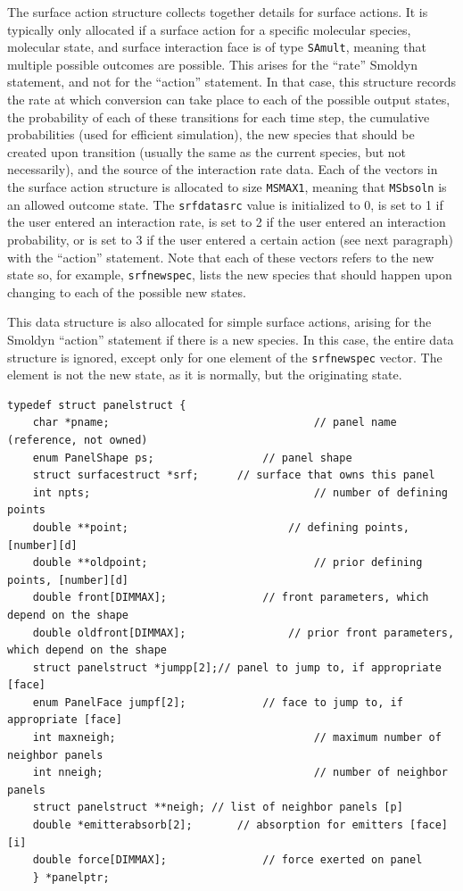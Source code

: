 \documentclass {scrbook}
\newcommand {\ttt} {\texttt}
\begin{document}
The surface action structure collects together details for surface actions. It is typically only allocated if a surface action for a specific molecular species, molecular state, and surface interaction face is of type \ttt{SAmult}, meaning that multiple possible outcomes are possible. This arises for the ``rate'' Smoldyn statement, and not for the ``action'' statement. In that case, this structure records the rate at which conversion can take place to each of the possible output states, the probability of each of these transitions for each time step, the cumulative probabilities (used for efficient simulation), the new species that should be created upon transition (usually the same as the current species, but not necessarily), and the source of the interaction rate data. Each of the vectors in the surface action structure is allocated to size \ttt{MSMAX1}, meaning that \ttt{MSbsoln} is an allowed outcome state. The \ttt{srfdatasrc} value is initialized to 0, is set to 1 if the user entered an interaction rate, is set to 2 if the user entered an interaction probability, or is set to 3 if the user entered a certain action (see next paragraph) with the ``action'' statement. Note that each of these vectors refers to the new state so, for example, \ttt{srfnewspec}, lists the new species that should happen upon changing to each of the possible new states.

This data structure is also allocated for simple surface actions, arising for the Smoldyn ``action'' statement if there is a new species. In this case, the entire data structure is ignored, except only for one element of the \ttt{srfnewspec} vector. The element is not the new state, as it is normally, but the originating state.

\begin{lstlisting}
typedef struct panelstruct {
	char *pname;								// panel name (reference, not owned)
	enum PanelShape ps;					// panel shape
	struct surfacestruct *srf;		// surface that owns this panel
	int npts;									// number of defining points
	double **point;							// defining points, [number][d]
	double **oldpoint;							// prior defining points, [number][d]
	double front[DIMMAX];				// front parameters, which depend on the shape
	double oldfront[DIMMAX];				// prior front parameters, which depend on the shape
	struct panelstruct *jumpp[2];// panel to jump to, if appropriate [face]
	enum PanelFace jumpf[2];			// face to jump to, if appropriate [face]
	int maxneigh;								// maximum number of neighbor panels
	int nneigh;									// number of neighbor panels
	struct panelstruct **neigh;	// list of neighbor panels [p]
	double *emitterabsorb[2];		// absorption for emitters [face][i]
	double force[DIMMAX];				// force exerted on panel
	} *panelptr;
\end{lstlisting}
\end{document}

